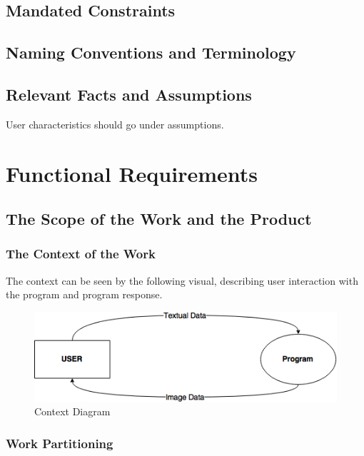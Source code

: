 \documentclass[12pt, titlepage]{article}
\begin{document}
\subsection{Mandated Constraints}

\subsection{Naming Conventions and Terminology}

\subsection{Relevant Facts and Assumptions}

User characteristics should go under assumptions.
\clearpage
\section{Functional Requirements}

\subsection{The Scope of the Work and the Product}

\subsubsection{The Context of the Work}
The context can be seen by the following visual, describing user interaction with the program and program response. \\
		
	\begin{figure}[!htb]
		\includegraphics[scale=0.8]{img/ContextDiagram.png}
		\caption{Context Diagram}
	\end{figure}
	
\subsubsection{Work Partitioning}
\end{document}
